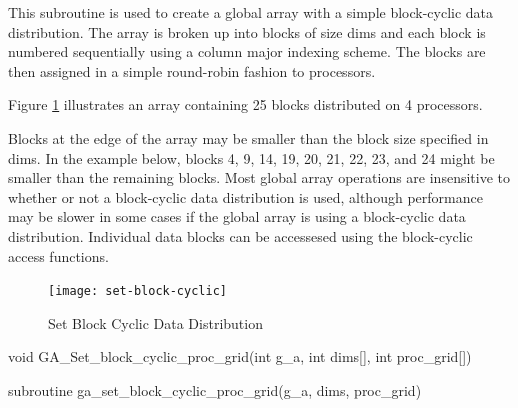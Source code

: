 \documentclass[12pt]{article}
\begin{document}
\begin{desc}

This subroutine is used to create a global array with a simple block-cyclic
data distribution. The array is broken up into blocks of size dims and each
block is numbered sequentially using a column major indexing scheme. The blocks
are then assigned in a simple round-robin fashion to processors.

Figure \ref{stblkcy} illustrates an array containing 25 blocks distributed on 4
processors.

Blocks at the edge of the array may be smaller than the block size specified in
dims. In the example below, blocks 4, 9, 14, 19, 20, 21, 22, 23, and 24 might
be smaller than the remaining blocks. Most global array operations are
insensitive to whether or not a block-cyclic data distribution is used,
although performance may be slower in some cases if the global array is using a
block-cyclic data distribution. Individual data blocks can be accessesed using
the block-cyclic access functions.

\begin{figure}
\centering
\texttt{[image: set-block-cyclic]}
\caption{Set Block Cyclic Data Distribution}
\label{stblkcy}
\end{figure}

\end{desc}


\begin{capi}
\begin{ccode}
void GA_Set_block_cyclic_proc_grid(int g_a, int dims[], int proc_grid[])
\end{ccode}
\begin{funcargs}
\end{funcargs}
\end{capi}

\begin{fapi}
\begin{fcode}
subroutine ga_set_block_cyclic_proc_grid(g_a, dims, proc_grid)
\end{fcode}
\begin{funcargs}
\end{funcargs}
\end{fapi}
\end{document}
